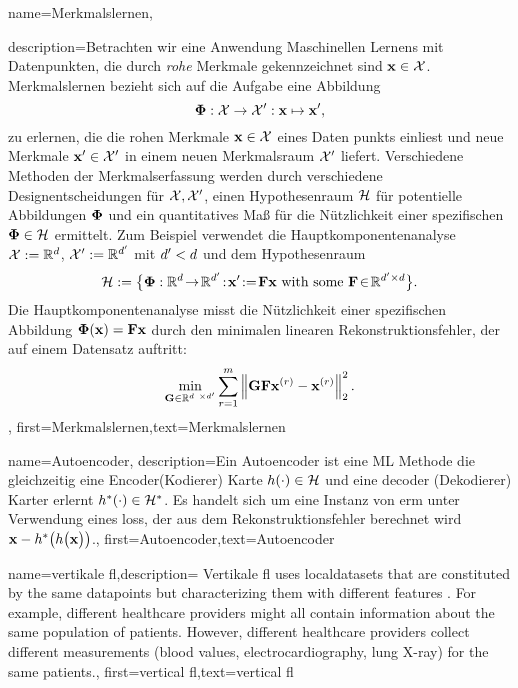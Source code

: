 	
{name={Merkmalslernen},

description={Betrachten wir eine Anwendung Maschinellen Lernens mit Datenpunkten, die durch \emph{rohe} \gls{Merkmal}e gekennzeichnet sind ${\bf x} \in \mathcal{X}$.
Merkmalslernen bezieht sich auf die Aufgabe eine Abbildung $${\bf \Phi}: \mathcal{X} \rightarrow \mathcal{X}': {\bf x} \mapsto {\bf x}',$$ zu erlernen, die die rohen \gls{Merkmal}e ${\bf x} \in \mathcal{X}$ 
eines \gls{Daten punkt}s einliest und neue \gls{Merkmal}e  ${\bf x}' \in \mathcal{X}'$  in einem neuen  \gls{Merkmalsraum} $\mathcal{X}'$ liefert. 
Verschiedene  Methoden der \gls{Merkmalserfassung} werden durch verschiedene Designentscheidungen für  $\mathcal{X},\mathcal{X}'$,  einen \gls{Hypothesenraum} $\mathcal{H}$  für potentielle Abbildungen ${\bf \Phi}$ und ein quantitatives 
Maß für die Nützlichkeit einer spezifischen ${\bf \Phi} \in \mathcal{H}$ ermittelt.
Zum Beispiel verwendet die  \gls{Hauptkomponentenanalyse} $\mathcal{X} := \mathbb{R}^{d}$, $\mathcal{X}' := \mathbb{R}^{d'}$ mit $d' < d$ und 
dem \gls{Hypothesenraum} $$\hypospace\defeq \big\{ \featuremapvec: \mathbb{R}^{\dimlocalmodel}
\!\rightarrow\! \mathbb{R}^{\dimlocalmodel'}\!:\!\featurevec'\!\defeq\!\mF \featurevec \mbox{ with some } \mF \!\in\! \mathbb{R}^{\dimlocalmodel' \times \dimlocalmodel} \big\}.$$
Die \gls{Hauptkomponentenanalyse} misst die Nützlichkeit einer spezifischen Abbildung ${\bf \Phi}({\bf x})= \mathbf{F} {\bf x}$ durch den minimalen linearen Rekonstruktionsfehler, der auf einem \gls{Datensatz} auftritt: 
$$ \min_{\mG \in \mathbb{R}^{\dimlocalmodel \times \dimlocalmodel'}} \sum_{\sampleidx=1}^{\samplesize} \normgeneric{\mG \mF \featurevec^{(\sampleidx)} - \featurevec^{(\sampleidx)}}{2}^{2}.$$ }, 
first={Merkmalslernen},text={Merkmalslernen}

{name={Autoencoder},
	description={Ein Autoencoder  ist eine ML Methode die gleichzeitig eine Encoder(Kodierer) Karte $h(\cdot) \in \mathcal{H}$  und eine decoder (Dekodierer) Karter erlernt $h^{*}(\cdot) \in \mathcal{H}^{*}$.
	Es handelt sich um eine Instanz von \gls{erm} unter Verwendung eines \gls{loss}, der aus dem Rekonstruktionsfehler berechnet wird 
		${\bf x} - h^{*}\big( h \big( {\bf x} \big) \big)$.},
	first={Autoencoder},text={Autoencoder}
} 

{name={vertikale \gls{fl}},description=
	{Vertikale \gls{fl} uses \gls{localdataset}s that are constituted 
	 by the same \gls{datapoint}s but characterizing them with different \gls{feature}s \cite{VFLChapter}. 
     For example, different healthcare providers might all contain information 
     about the same population of patients. However, different healthcare providers 
     collect different measurements (blood values, electrocardiography, lung X-ray) 
     for the same patients.},
	first={vertical \gls{fl}},text={vertical \gls{fl}}
} 

}
